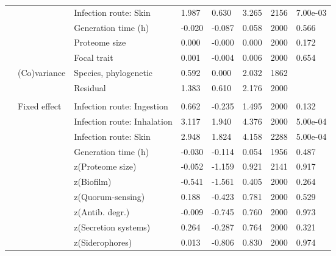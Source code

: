 \begin{table}
\begin{tabular}[t]{llllllll}
\hspace{1em} &  & Infection route: Skin & 1.987 & 0.630 & 3.265 & 2156 & 7.00e-03\\
\hspace{1em} &  & Generation time (h) & -0.020 & -0.087 & 0.058 & 2000 & 0.566\\
\hspace{1em} &  & Proteome size & 0.000 & -0.000 & 0.000 & 2000 & 0.172\\
\hspace{1em} &  & Focal trait & 0.001 & -0.004 & 0.006 & 2000 & 0.654\\
\hspace{1em} & (Co)variance & Species, phylogenetic & 0.592 & 0.000 & 2.032 & 1862 & \\
\hspace{1em} &  & Residual & 1.383 & 0.610 & 2.176 & 2000 & \\
\addlinespace[0.3em]
\multicolumn{8}{l}{\textbf{Multivariate model}}\\
\hspace{1em} & Fixed effect & Infection route: Ingestion & 0.662 & -0.235 & 1.495 & 2000 & 0.132\\
\hspace{1em} &  & Infection route: Inhalation & 3.117 & 1.940 & 4.376 & 2000 & 5.00e-04\\
\hspace{1em} &  & Infection route: Skin & 2.948 & 1.824 & 4.158 & 2288 & 5.00e-04\\
\hspace{1em} &  & Generation time (h) & -0.030 & -0.114 & 0.054 & 1956 & 0.487\\
\hspace{1em} &  & z(Proteome size) & -0.052 & -1.159 & 0.921 & 2141 & 0.917\\
\hspace{1em} &  & z(Biofilm) & -0.541 & -1.561 & 0.405 & 2000 & 0.264\\
\hspace{1em} &  & z(Quorum-sensing) & 0.188 & -0.423 & 0.781 & 2000 & 0.529\\
\hspace{1em} &  & z(Antib. degr.) & -0.009 & -0.745 & 0.760 & 2000 & 0.973\\
\hspace{1em} &  & z(Secretion systems) & 0.264 & -0.287 & 0.764 & 2000 & 0.321\\
\hspace{1em} &  & z(Siderophores) & 0.013 & -0.806 & 0.830 & 2000 & 0.974\\

\end{tabular}
\end{table}
